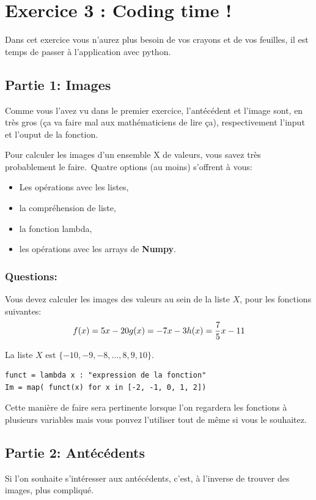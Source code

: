\documentclass[11pt, french]{article}
\begin{document}
\section*{Exercice 3 : Coding time !}
Dans cet exercice vous n'aurez plus besoin de vos crayons et de vos feuilles, il est temps de passer à l'application avec python.

\subsection*{Partie 1: Images}
Comme vous l'avez vu dans le premier exercice, l'antécédent et l'image sont, en très gros (ça va faire mal aux mathématiciens de lire ça), respectivement l'input et l'ouput de la fonction.

Pour calculer les images d'un ensemble X de valeurs, vous savez très probablement le faire.\
Quatre options (au moins) s'offrent à vous:
\begin{itemize}
    \item Les opérations avec les listes,
    \item la compréhension de liste,
    \item la fonction lambda,
    \item les opérations avec les arrays de \textbf{Numpy}.
\end{itemize}

\subsubsection*{Questions:}
Vous devez calculer les images des valeurs au sein de la liste $X$, pour les fonctions suivantes:
\begin{equation}\nonumber
f(x) = 5x -20\\
g(x) = -7x -3 \\
h(x) = \frac{7}{5}x -11
\end{equation}

La liste $X$ est $\{ -10, -9, -8, ..., 8, 9, 10\}$.

\begin{lstlisting}[style=nightly]
funct = lambda x : "expression de la fonction"
Im = map( funct(x) for x in [-2, -1, 0, 1, 2])
\end{lstlisting}
Cette manière de faire sera pertinente lorsque l'on regardera les fonctions à plusieurs variables mais vous pouvez l'utiliser tout de même si vous le souhaitez.

\subsection*{Partie 2: Antécédents}
Si l'on souhaite s'intéresser aux antécédents, c'est, à l'inverse de trouver des images, plus compliqué.
\end{document}
